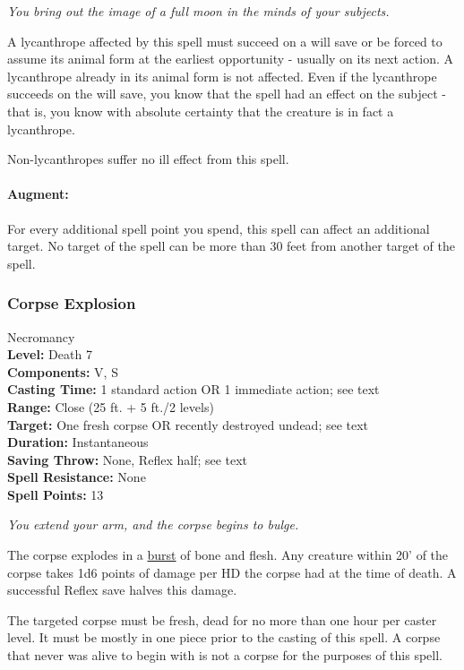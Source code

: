 \emph{You bring out the image of a full moon in the minds of your subjects.}

A lycanthrope affected by this spell must succeed on a will save or be forced to assume its animal form at the earliest opportunity - usually on its next action. A lycanthrope already in its animal form is not affected.
Even if the lycanthrope succeeds on the will save, you know that the spell had an effect on the subject - that is, you know with absolute certainty that the creature is in fact a lycanthrope.

Non-lycanthropes suffer no ill effect from this spell.
\paragraph{Augment:}
For every additional spell point you spend, this spell can affect an additional target.%
No target of the spell can be more than 30 feet from another target of the spell.

\subsubsection{Corpse Explosion}
\label{Spell:CorpseExplosion}
Necromancy
\\ \textbf{Level:} Death 7
\\ \textbf{Components:} V, S
\\ \textbf{Casting Time:} 1 standard action OR 1 immediate action; see text
\\ \textbf{Range:} Close (25 ft. + 5 ft./2 levels)
\\ \textbf{Target:} One fresh corpse OR recently destroyed undead; see text
\\ \textbf{Duration:} Instantaneous
\\ \textbf{Saving Throw:} None, Reflex half; see text
\\ \textbf{Spell Resistance:} None
\\ \textbf{Spell Points:} 13

\emph{You extend your arm, and the corpse begins to bulge.}

The corpse explodes in a \hyperref[sec:AreaShapes]{burst} of bone and flesh.
Any creature within 20' of the corpse takes 1d6 points of damage per HD the corpse had at the time of death. A successful Reflex save halves this damage. 

The targeted corpse must be fresh, dead for no more than one hour per caster level. It must be mostly in one piece prior to the casting of this spell. A corpse that never was alive to begin with is not a corpse for the purposes of this spell. 

